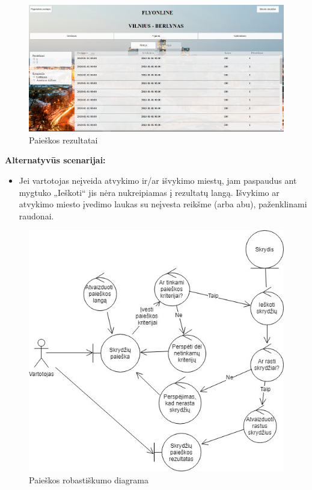 \documentclass{VUMIFPSkursinis}
\begin{document}
\begin{enumerate}[label=\textbf{U\arabic*}.]
                    \begin{figure}[H]
                        \centering
                        \includegraphics[scale=0.4]{img/search_one_way}
                        \caption{Paieškos rezultatai}
                        \label{results_one_way}
                    \end{figure}
                    \newpage\textbf{Alternatyvūs scenarijai:}
                    \begin{itemize}
                        \item Jei vartotojas neįveida atvykimo ir/ar išvykimo miestų, jam paspaudus ant mygtuko „Ieškoti“ jis nėra nukreipiamas į rezultatų langą. Išvykimo ar atvykimo miesto įvedimo laukas su neįvesta reikšme (arba abu), paženklinami raudonai.
                    \end{itemize}

                    \begin{figure}[H]
                        \centering
                        \includegraphics[scale=0.8]{img/ROBsearch}
                        \caption{Paieškos robastiškumo diagrama}
                        \label{home_page_one_way}
                    \end{figure}


\end{enumerate}
\end{document}
